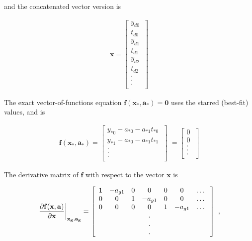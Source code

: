 \documentclass[psfig,preprint]{aastex}
\begin{document}
\noindent and the concatenated vector version is

\begin{eqnarray}
\mathbf {x} = \left[
\begin{array}{c}
y_{d0} \\
t_{d0} \\
y_{d1} \\
t_{d1} \\
y_{d2} \\
t_{d2} \\
. \\
. \\
. \\
\end{array}
\ \right]
\end{eqnarray}

\noindent The exact vector-of-functions equation $\mathbf{ f(x_*,a_*) =
0}$ uses the starred (best-fit) values, and is

\begin{eqnarray} \label{star0}
\mathbf{ f(x_*,a_*)} = 
\left[
\begin{array}{c}
y_{*0} - a_{*0} - a_{*1} t_{*0} \\ 
y_{*1} - a_{*0} - a_{*1} t_{*1} \\ 
. \\
. \\
. \\
\end{array}
\; \right]
\; =
\left[
\begin{array}{c}
0 \\
0 \\
. \\
. \\
. \\
\end{array}
\; \right]
\end{eqnarray}

\noindent The derivative matrix of $\mathbf{f}$
with respect to the vector $\mathbf{x}$ is 

\begin{eqnarray}
\mathbf{\left.{ \partial f(x, a) \over \partial x}\right|_{x_g, a_g} }  =
\left[
\begin{array}{ccccccc}
1 & -a_{g1} & 0 & 0 & 0 & 0 & \dots \\
0 & 0 & 1 & -a_{g1} & 0 & 0 & \dots \\
0 & 0 & 0 & 0 & 1 & -a_{g1} & \dots \\
  &  & &   .  &  & & \\
  &  & &   .  &  & & \\
  &  & &   .  &  & & \\
\end{array}
\; \right] \ ,
\end{eqnarray}
\end{document}

